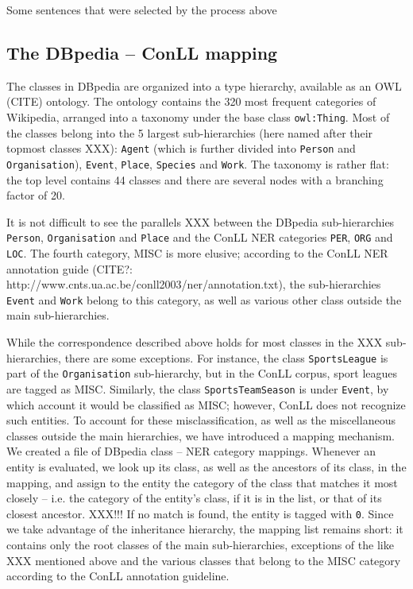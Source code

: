 \documentclass[11pt]{article}
\begin{document}
Some sentences that were selected by the process above


\subsection{The DBpedia -- ConLL mapping}


The classes in DBpedia are organized into a type hierarchy, available as an OWL (CITE) ontology. The ontology contains the 320 most frequent categories of Wikipedia, arranged into a taxonomy under the base class \texttt{owl:Thing}. Most of the classes belong into the 5 largest sub-hierarchies (here named after their topmost classes XXX): \texttt{Agent} (which is further divided into \texttt{Person} and \texttt{Organisation}), \texttt{Event}, \texttt{Place}, \texttt{Species} and \texttt{Work}. The taxonomy is rather flat: the top level contains 44 classes and there are several nodes with a branching factor of 20.

It is not difficult to see the parallels XXX between the DBpedia sub-hierarchies \texttt{Person}, \texttt{Organisation} and \texttt{Place} and the ConLL NER categories \texttt{PER}, \texttt{ORG} and \texttt{LOC}. The fourth category, MISC is more elusive; according to the ConLL NER annotation guide (CITE?: http://www.cnts.ua.ac.be/conll2003/ner/annotation.txt), the sub-hierarchies \texttt{Event} and \texttt{Work} belong to this category, as well as various other class outside the main sub-hierarchies. 

While the correspondence described above holds for most classes in the XXX sub-hierarchies, there are some exceptions. For instance, the class \texttt{SportsLeague} is part of the \texttt{Organisation} sub-hierarchy, but in the ConLL corpus, sport leagues are tagged as MISC. Similarly, the class \texttt{SportsTeamSeason} is under \texttt{Event}, by which account it would be classified as MISC; however, ConLL does not recognize such entities. To account for these misclassification, as well as the miscellaneous classes outside the main hierarchies, we have introduced a mapping mechanism. We created a file of DBpedia class -- NER category mappings. Whenever an entity is evaluated, we look up its class, as well as the ancestors of its class, in the mapping, and assign to the entity the category of the class that matches it most closely -- i.e. the category of the entity's class, if it is in the list, or that of its closest ancestor. XXX!!! If no match is found, the entity is tagged with \texttt{0}. Since we take advantage of the inheritance hierarchy, the mapping list remains short: it contains only the root classes of the main sub-hierarchies, exceptions of the like XXX mentioned above and the various classes that belong to the MISC category according to the ConLL annotation guideline.
\end{document}
